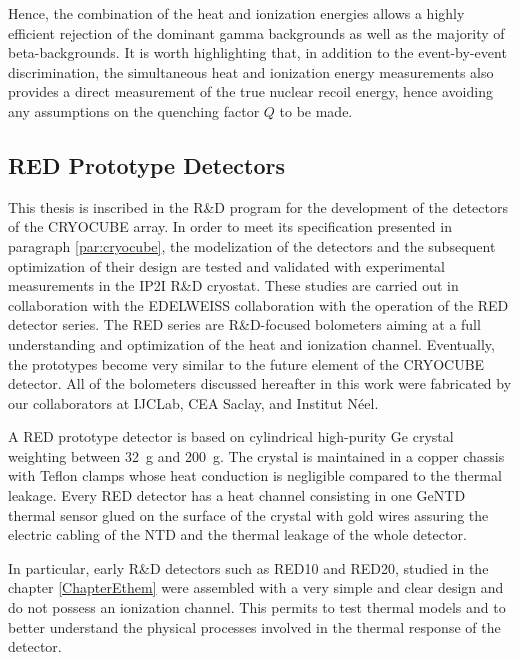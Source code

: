 Hence, the combination of the heat and ionization energies allows a highly efficient rejection of the dominant gamma backgrounds as well as the majority of beta-backgrounds. It is worth highlighting  that, in addition to the event-by-event discrimination, the simultaneous heat and ionization energy measurements also provides a direct measurement of the true nuclear recoil energy, hence avoiding any assumptions on the quenching factor $Q$ to be made. 




\subsection{RED Prototype Detectors}

This thesis is inscribed in the R\&D program for the development of the detectors of the CRYOCUBE array. In order to meet its specification presented in paragraph \ref{par:cryocube}, the modelization of the detectors and the subsequent optimization of their design are tested and validated with experimental measurements in the IP2I R\&D cryostat.
These studies are carried out in collaboration with the EDELWEISS collaboration with the operation of the RED detector series. The RED series are R\&D-focused bolometers aiming at a full understanding and optimization of the heat and ionization channel. Eventually, the prototypes become very similar to the future element of the CRYOCUBE detector. All of the bolometers discussed hereafter in this work were fabricated by our collaborators at IJCLab, CEA Saclay, and Institut Néel. 

A RED prototype detector is based on cylindrical high-purity Ge crystal weighting between \SI{32}{\g} and \SI{200}{\g}. The crystal is maintained in a copper chassis with Teflon clamps whose heat conduction is negligible compared to the thermal leakage. Every RED detector has a heat channel consisting in one GeNTD thermal sensor glued on the surface of the crystal with gold wires assuring the electric cabling of the NTD and the thermal leakage of the whole detector. 

In particular, early R\&D detectors such as RED10 and RED20, studied in the chapter \ref{ChapterEthem} were assembled with a very simple and clear design and do not possess an ionization channel. This permits to test thermal models and to better understand the physical processes involved in the thermal response of the detector.

